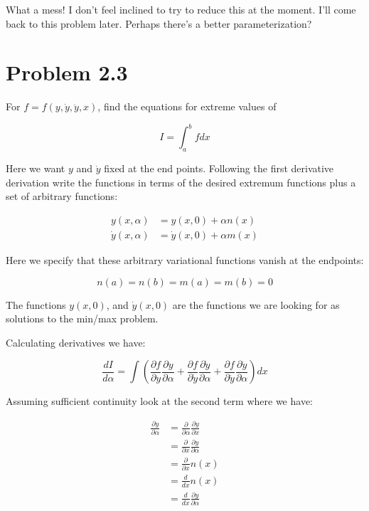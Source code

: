 \documentclass{article}
\newcommand{\ydot}[0]{\dot{y}}
\newcommand{\yddot}[0]{\ddot{y}}
\newcommand{\PD}[2]{\frac{\partial {#2}}{\partial {#1}}}
\begin{document}
What a mess!  I don't feel inclined to try to reduce this at the moment.  I'll come back to this problem later.  Perhaps there's a better parameterization?

\section{ Problem 2.3 }

For $f = f( y, \ydot, \yddot, x )$, find the equations for extreme values of

\begin{equation*}
I = \int_a^b f dx
\end{equation*}

Here we want $y$ and $\ydot$ fixed at the end points.  Following the first derivative derivation write the 
functions in terms of the desired extremum functions plus a set of arbitrary functions:

\begin{align*}
y( x, \alpha ) &= y( x, 0 ) + \alpha n(x) \\
\ydot( x, \alpha ) &= \ydot( x, 0 ) + \alpha m(x)
\end{align*}

Here we specify that these arbitrary variational functions vanish at the endpoints:

\begin{equation*}
n(a) = n(b) = m(a) = m(b) = 0
\end{equation*}

The functions $y(x, 0)$, and $\ydot(x, 0)$ are the functions we are looking for as solutions to the min/max problem.

Calculating derivatives we have:

\begin{equation*}
\frac{dI}{d\alpha} = 
\int \left( 
\PD{y}{f} \PD{\alpha}{y}
+\PD{\ydot}{f} \PD{\alpha}{\ydot}
+\PD{\yddot}{f} \PD{\alpha}{\yddot}
\right) d x
\end{equation*}

Assuming sufficient continuity look at the second term where we have:

\begin{align*}
\PD{\alpha}{\ydot} 
&= \PD{\alpha}{} \PD{x}{y} \\
&= \PD{x}{} \PD{\alpha}{y} \\
&= \PD{x}{} n(x) \\
&= \frac{d}{ d x} n(x) \\
&= \frac{d}{ d x} \PD{\alpha}{y} \\
\end{align*}
\end{document}
